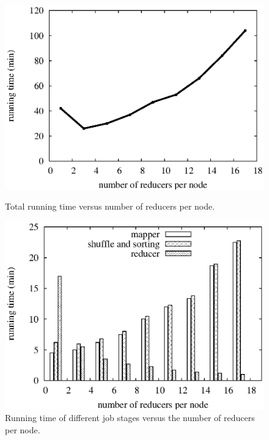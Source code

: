 \begin{figure}[htbp]
\hfill
\begin{minipage}[t]{0.45\linewidth}
\begin{center}
\centerline{\includegraphics[scale=0.33]{plots/reducer-scale.eps}}
\caption{Total running time versus number of reducers per node.}
\label{fig:reducer-scale}
\end{center}
\end{minipage}
\hfill
\begin{minipage}[t]{0.45\linewidth}
\begin{center}
\centerline{\includegraphics[scale=0.33]{plots/reducer-scale-timeslice.eps}}
\caption{Running time of different job stages versus the number of reducers per node.}
\label{fig:reducer-scale-timeslice}
\end{center}
\end{minipage}
\hfill
\end{figure}

